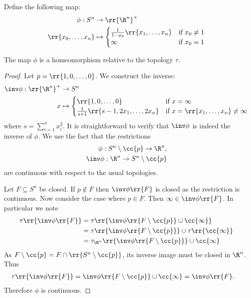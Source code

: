 \documentclass{article}
\begin{document}
Define the following map:
\begin{align*}
	\phi : S^n          & \to \rr{\R^n}^+                                                    \\
	\rr{x_0,\ldots,x_n} & \mapsto \begin{cases}
		                              \frac{1}{1-x_0}\rr{x_1,\ldots,x_n} & \text{if $x_0\neq 1$} \\
		                              \infty                             & \text{if $x_0=1$}
	                              \end{cases}
\end{align*}

\begin{claim*}
	The map $\phi$ is a homeomorphism relative to the topology $\tau$.
	\begin{proof}
		Let $p=\rr{1,0,\ldots,0}$. We construct the inverse:
		\begin{align*}
			\inv\phi : \rr{\R^n}^+ & \to S^n                                                                                            \\
			x                      & \mapsto \begin{cases}
				                                 \rr{1, 0, \ldots, 0}                      & \text{if $x=\infty$}                        \\
				                                 \frac{1}{s+1}\rr{s-1, 2x_1, \ldots, 2x_n} & \text{if $x=\rr{x_1,\ldots,x_n}\neq\infty$}
			                                 \end{cases}
		\end{align*}
		where $s=\sum_{i=1}^n x_i^2$. It is straightforward to verify that $\inv\phi$ is indeed
		the inverse of $\phi$.
		We use the fact that the restrictions
		\begin{align*}
			\phi: S^n\setminus\cc{p}\to\R^n, \\
			\inv\phi:\R^n\to S^n\setminus\cc{p}
		\end{align*}
		are continuous with respect to the usual topologies.

		Let $F\subseteq S^n$ be closed. If $p\not\in F$ then $\inv\phi\rr{F}$ is
		closed as the restriction
		is continuous. Now consider the case where $p\in F$. Then
		$\infty\in \inv\phi\rr{F}$. In particular we note
		\begin{align*}
			\tau\rr{\inv\phi\rr{F}} & = \tau\rr{\inv\phi\rr{F\setminus\cc{p}}\cup\cc{\infty}}          \\
			                        & = \tau\rr{\inv\phi\rr{F\setminus\cc{p}}}\cup\tau\rr{\cc{\infty}} \\
			                        & = \tau_{\R^n}\rr{\inv\phi\rr{F\setminus\cc{p}}}\cup\cc{\infty}
		\end{align*}
		As $F\setminus\cc{p} = F\cap \rr{S^n\setminus\cc{p}}$, its inverse image
		must be closed in $\R^n$. Thus
		\begin{align*}
			\tau\rr{\inv\phi\rr{F}} & = \inv\phi\rr{F\setminus\cc{p}}\cup\cc{\infty} = \inv\phi\rr{F}.
		\end{align*}
		Therefore $\phi$ is continuous.


\end{proof}
\end{claim*}
\end{document}
